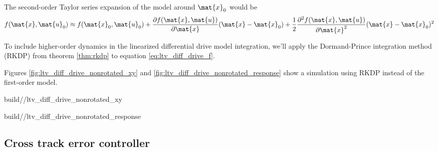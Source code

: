 The second-order Taylor series expansion of the \gls{model} around $\mat{x}_0$
would be
\begin{equation*}
  f(\mat{x}, \mat{u}_0) \approx f(\mat{x}_0, \mat{u}_0) +
    \frac{\partial f(\mat{x}, \mat{u})}{\partial\mat{x}}(\mat{x} - \mat{x}_0) +
    \frac{1}{2}\frac{\partial^2 f(\mat{x}, \mat{u})}{\partial\mat{x}^2}
    (\mat{x} - \mat{x}_0)^2
\end{equation*}

To include higher-order dynamics in the linearized differential drive model
integration, we'll apply the Dormand-Prince integration method (RKDP) from
theorem \ref{thm:rkdp} to equation \eqref{eq:ltv_diff_drive_f}.

Figures \ref{fig:ltv_diff_drive_nonrotated_xy} and
\ref{fig:ltv_diff_drive_nonrotated_response} show a simulation using RKDP
instead of the first-order \gls{model}.
\begin{bookfigure}
  \begin{minisvg}{2}{build/\chapterpath/ltv_diff_drive_nonrotated_xy}
    \caption{Linear time-varying differential drive controller (global reference
        frame formulation) x-y plot}
    \label{fig:ltv_diff_drive_nonrotated_xy}
  \end{minisvg}
  \hfill
  \begin{minisvg}{2}{build/\chapterpath/ltv_diff_drive_nonrotated_response}
    \caption{Linear time-varying differential drive controller (global reference
        frame formulation) response}
    \label{fig:ltv_diff_drive_nonrotated_response}
  \end{minisvg}
\end{bookfigure}

\subsection{Cross track error controller}

